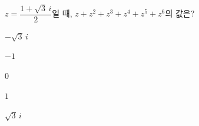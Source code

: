 $z=\dfrac{1+\sqrt{3}\,i}{2}$일 때, $z+z^2+z^3+z^4+z^5+z^6$의 값은?
\begin{choices32}{\rule[-3ex]{0pt}{8ex}$-\sqrt{3}\,i$}{\rule[-3ex]{0pt}{8ex}$-1$}{\rule[-3ex]{0pt}{8ex}$0$}{\rule[-3ex]{0pt}{8ex}$1$}{\rule[-3ex]{0pt}{8ex}$\sqrt{3}\,i$}\end{choices32}
